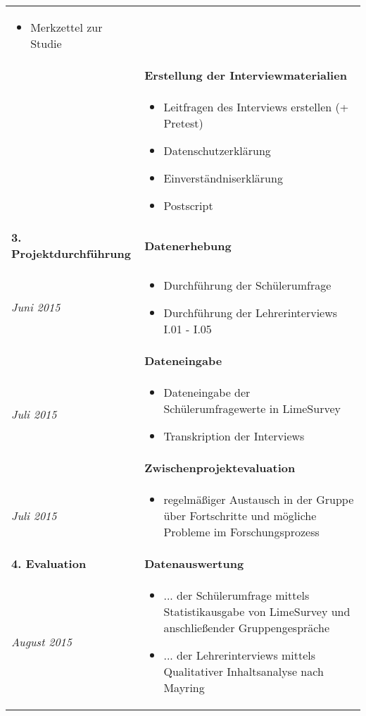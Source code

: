 \begin{longtable}{l|p{9.8cm}}
\begin{itemize}[nosep,topsep=-0.6cm]
		\item Merkzettel zur Studie
	\end{itemize} \\
	& \textbf{Erstellung der Interviewmaterialien} \\*
	& 
	\vspace*{-0.6cm}
	\begin{itemize}[nosep,topsep=-0.6cm]
		\item Leitfragen des Interviews erstellen (+ Pretest)
		\item Datenschutzerklärung
		\item Einverständniserklärung
		\item Postscript
	\end{itemize} \\
	
	\textbf{3. Projektdurchführung} & \textbf{Datenerhebung} \\*
	\emph{Juni 2015} &
	\vspace*{-0.6cm}
	\begin{itemize}[nosep,topsep=-0.6cm]
		\item Durchführung der Schülerumfrage
		\item Durchführung der Lehrerinterviews I.01 - I.05
	\end{itemize} \\
	& \textbf{Dateneingabe} \\*
	\emph{Juli 2015} &
	\vspace*{-0.6cm}
	\begin{itemize}[nosep,topsep=-0.6cm]
		\item Dateneingabe der Schülerumfragewerte in LimeSurvey
		\item Transkription der Interviews
	\end{itemize} \\
	& \textbf{Zwischenprojektevaluation} \\*
	\emph{Juli 2015} &
	\vspace*{-0.6cm}
	\begin{itemize}[nosep,topsep=-0.6cm]
		\item regelmäßiger Austausch in der Gruppe über Fortschritte und mögliche Probleme im Forschungsprozess
	\end{itemize} \\
	
	\textbf{4. Evaluation} & \textbf{Datenauswertung} \\*
	\emph{August 2015} &
	\vspace*{-0.6cm}
	\begin{itemize}[nosep,topsep=-0.6cm]
		\item ... der Schülerumfrage mittels Statistikausgabe von LimeSurvey und anschließender Gruppengespräche
		\item ... der Lehrerinterviews mittels Qualitativer Inhaltsanalyse nach Mayring
	\end{itemize} \\
	

\end{longtable}
